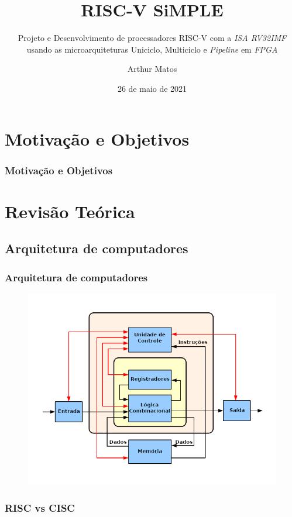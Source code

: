 \documentclass[aspectratio=169]{beamer}
\title{RISC-V SiMPLE}
\subtitle{Projeto e Desenvolvimento de processadores RISC-V com a \textit{ISA RV32IMF} usando as microarquiteturas Uniciclo, Multiciclo e \textit{Pipeline} em \textit{FPGA}}
\author{Arthur Matos}
\institute{Universidade de Brasília - UnB}
\date{26 de maio de 2021}
\begin{document}
\begin{frame}
\titlepage
\end{frame}


\section{Motivação e Objetivos}
    \begin{frame}
        \frametitle{Motivação e Objetivos}
        \vfill
        {}
        \vfill
    \end{frame}

\section{Revisão Teórica}
    \subsection{Arquitetura de computadores}
    \begin{frame}
        \frametitle{Arquitetura de computadores}
        \vfill
        \begin{figure}[H]
        \centering
            \includegraphics[width=.9\textwidth,height=.9\textheight,keepaspectratio]{../images/ABasicComputer.png}
        \end{figure}
        \vfill
    \end{frame}

    \begin{frame}
        \frametitle{RISC vs CISC}
        \vfill
        {}
        \vfill
    \end{frame}
\end{document}
